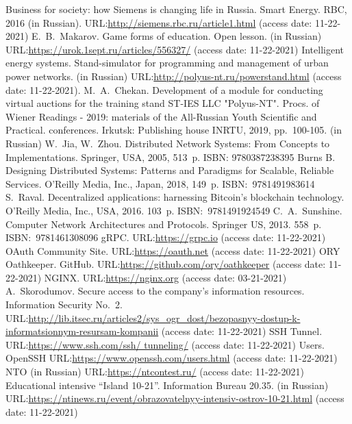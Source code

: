 \documentclass[
]{ceurart}
\begin{document}
\begin{thebibliography}{99}
    Business for society: how Siemens is changing life in Russia. Smart Energy. RBC, 2016 (in Russian). URL:\url{http://siemens.rbc.ru/article1.html} (access date: 11-22-2021)
    E.~B.~Makarov. Game forms of education. Open lesson. (in Russian) URL:\url{https://urok.1sept.ru/articles/556327/} (access date: 11-22-2021)
    Intelligent energy systems. Stand-simulator for programming and management of urban power networks. (in Russian) URL:\url{http://polyus-nt.ru/powerstand.html} (access date: 11-22-2021).
    M.~A.~Chekan. Development of a module for conducting virtual auctions for the training stand ST-IES LLC "Polyus-NT". Procs. of Wiener Readings - 2019: materials of the All-Russian Youth Scientific and Practical. conferences. Irkutsk: Publishing house INRTU, 2019,  pp.~100-105. (in Russian)
    W.~Jia, W.~Zhou. Distributed Network Systems: From Concepts to Implementations. Springer, USA, 2005, 513~p. ISBN: 9780387238395
    Burns B. Designing Distributed Systems: Patterns and Paradigms for Scalable, Reliable Services. O'Reilly Media, Inc., Japan, 2018, 149~p. ISBN:~9781491983614
    S.~Raval. Decentralized applications: harnessing Bitcoin's blockchain technology.  O'Reilly Media, Inc., USA, 2016. 103~p. ISBN:~9781491924549
    C.~A.~Sunshine. Computer Network Architectures and Protocols. Springer US, 2013. 558~p. ISBN:~9781461308096
    gRPC. URL:\url{https://grpc.io} (access date: 11-22-2021)
    OAuth Community Site. URL:\url{https://oauth.net} (access date: 11-22-2021)
    ORY Oathkeeper. GitHub. URL:\url{https://github.com/ory/oathkeeper} (access date: 11-22-2021)
    NGINX. URL:\url{https://nginx.org} (access date: 03-21-2021)
    A.~Skorodumov. Secure access to the company's information resources.  Information Security No.~2. URL:\url{http://lib.itsec.ru/articles2/sys_ogr_dost/bezopasnyy-dostup-k-informatsionnym-resursam-kompanii} (access date: 11-22-2021)
    SSH Tunnel. URL:\url{https://www.ssh.com/ssh/ tunneling/} (access date: 11-22-2021)
    Users. OpenSSH URL:\url{https://www.openssh.com/users.html} (access date: 11-22-2021)
    NTO (in Russian) URL:\url{https://ntcontest.ru/} (access date: 11-22-2021)
    Educational intensive ``Island 10-21''. Information Bureau 20.35. (in Russian) URL:\url{https://ntinews.ru/event/obrazovatelnyy-intensiv-ostrov-10-21.html} (access date: 11-22-2021)

\end{thebibliography}
\end{document}
